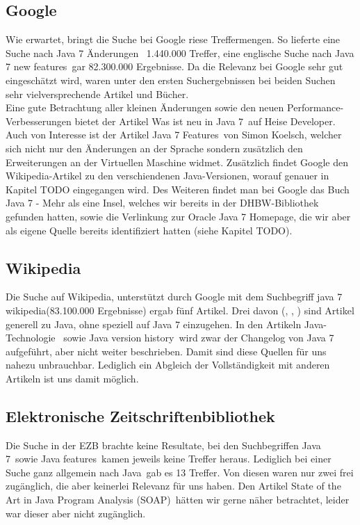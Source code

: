 \subsection{Google}
Wie erwartet, bringt die Suche bei Google riese Treffermengen. So lieferte eine Suche nach \glqq Java 7 Änderungen\grqq~
1.440.000 Treffer, eine englische Suche nach \glqq Java 7 new features\grqq~gar 82.300.000 Ergebnisse. Da die Relevanz bei
Google sehr gut eingeschätzt wird, waren unter den ersten Suchergebnissen bei beiden Suchen sehr vielversprechende Artikel
und Bücher.\\

Eine gute Betrachtung aller kleinen Änderungen sowie den neuen Performance-Verbesserungen bietet der Artikel
\glqq Was ist neu in Java 7\grqq\cite{heiseWasistNeu}~auf Heise Developer.
Auch von Interesse ist der Artikel \glqq Java 7 Features\grqq\cite{blogJava7Features}~von Simon Koelsch, welcher sich nicht nur
den Änderungen an der Sprache sondern zusätzlich den Erweiterungen an der Virtuellen Maschine widmet.
Zusätzlich findet Google den Wikipedia-Artikel zu den verschiendenen Java-Versionen, worauf genauer in Kapitel TODO eingegangen wird.
Des Weiteren findet man bei Google das Buch \glqq Java 7 - Mehr als eine Insel\grqq\cite{javainsel2}, welches wir bereits in der
DHBW-Bibliothek gefunden hatten, sowie die Verlinkung zur Oracle Java 7 Homepage, die wir aber als eigene Quelle bereits
identifiziert hatten (siehe Kapitel TODO).

\subsection{Wikipedia}
Die Suche auf Wikipedia, unterstützt durch Google mit dem Suchbegriff \glqq java 7 wikipedia\grqq (83.100.000 Ergebnisse) ergab
fünf Artikel. Drei davon (\cite{wikiJavaSoftwarePlatform}, \cite{wikiJavaProgrammiersprache}, \cite{wikiJavaStandardEdition})
sind Artikel generell zu Java, ohne speziell auf Java 7 einzugehen. In den Artikeln \glqq Java-Technologie\grqq\cite{wikiJavaTechnologie}
~sowie \glqq Java version history\grqq\cite{wikiJavaVersionHistory}~wird zwar der Changelog von Java 7 aufgeführt, aber nicht
weiter beschrieben. Damit sind diese Quellen für uns nahezu unbrauchbar. Lediglich ein Abgleich der Vollständigkeit mit anderen
Artikeln ist uns damit möglich.

\subsection{Elektronische Zeitschriftenbibliothek}
Die Suche in der EZB brachte keine Resultate, bei den Suchbegriffen \glqq Java 7\grqq~sowie \glqq Java features\grqq~kamen
jeweils keine Treffer heraus. Lediglich bei einer Suche ganz allgemein nach \glqq Java\grqq~gab es 13 Treffer. Von diesen waren
nur zwei frei zugänglich, die aber keinerlei Relevanz für uns haben. Den Artikel \glqq State of the Art in Java Program Analysis
(SOAP)\grqq~hätten wir gerne näher betrachtet, leider war dieser aber nicht zugänglich.

